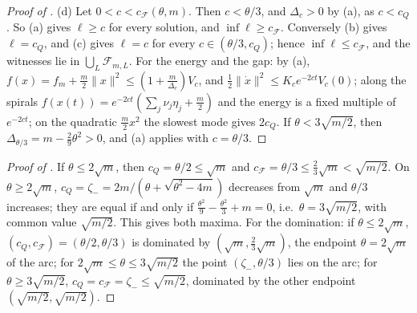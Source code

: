 \documentclass[11pt]{article}
\theoremstyle{definition}
\theoremstyle{remark}
\newcommand{\cF}{\mathcal F}
\newcommand{\norm}[1]{\lVert #1\rVert}
\newcommand{\cQ}{c_{Q}}
\newcommand{\cFF}{c_{\cF}}
\begin{document}
\begin{proof}[Proof of ]
(d) Let \(0<c<\cFF(\theta,m)\).  Then \(c<\theta/3\), and \(\Delta_c>0\) by (a), as \(c<\cQ\).  So (a) gives \(\ell\ge c\) for every solution, and \(\inf\ell\ge\cFF\).
Conversely (b) gives \(\ell=\cQ\), and (c) gives \(\ell=c\) for every \(c\in(\theta/3,\cQ)\); hence \(\inf\ell\le\cFF\),
and the witnesses lie in \(\bigcup_L\cF_{m,L}\).  For the energy and the gap: by (a),
\(f(x)=f_m+\frac m2\norm x^2\le(1+\frac m{\Delta_c})V_c\), and \(\frac12\norm{\dot x}^2\le K_ce^{-2ct}V_c(0)\); along the spirals
\(f(x(t))=e^{-2ct}(\sum_j\nu_j\eta_j+\frac m2)\) and the energy is a fixed multiple of \(e^{-2ct}\); on the quadratic
\(\frac m2x^2\) the slowest mode gives \(2\cQ\).  If \(\theta<3\sqrt{m/2}\), then \(\Delta_{\theta/3}=m-\frac29\theta^2>0\), and (a)
applies with \(c=\theta/3\).
\end{proof}

\begin{proof}[Proof of ]
If \(\theta\le2\sqrt m\), then \(\cQ=\theta/2\le\sqrt m\) and \(\cFF=\theta/3\le\frac23\sqrt m<\sqrt{m/2}\).  On \(\theta\ge2\sqrt m\),
\(\cQ=\zeta_-=2m/(\theta+\sqrt{\theta^2-4m})\) decreases from \(\sqrt m\) and \(\theta/3\) increases; they are equal if and
only if \(\frac{\theta^2}9-\frac{\theta^2}3+m=0\), i.e.\ \(\theta=3\sqrt{m/2}\), with common value \(\sqrt{m/2}\).  This gives both
maxima.  For the domination: if \(\theta\le2\sqrt m\), \((\cQ,\cFF)=(\theta/2,\theta/3)\) is dominated by
\((\sqrt m,\frac23\sqrt m)\), the endpoint \(\theta=2\sqrt m\) of the arc; for \(2\sqrt m\le\theta\le3\sqrt{m/2}\) the point
\((\zeta_-,\theta/3)\) lies on the arc; for \(\theta\ge3\sqrt{m/2}\), \(\cQ=\cFF=\zeta_-\le\sqrt{m/2}\), dominated by the other
endpoint \((\sqrt{m/2},\sqrt{m/2})\).
\end{proof}
\end{document}
